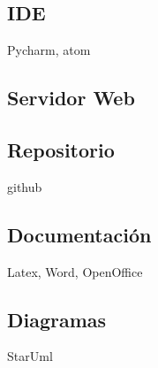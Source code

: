 \subsection{IDE}

Pycharm, atom

\subsection{Servidor Web}


\subsection{Repositorio}
github

\subsection{Documentación}

Latex, Word, OpenOffice

\subsection{Diagramas}
StarUml
